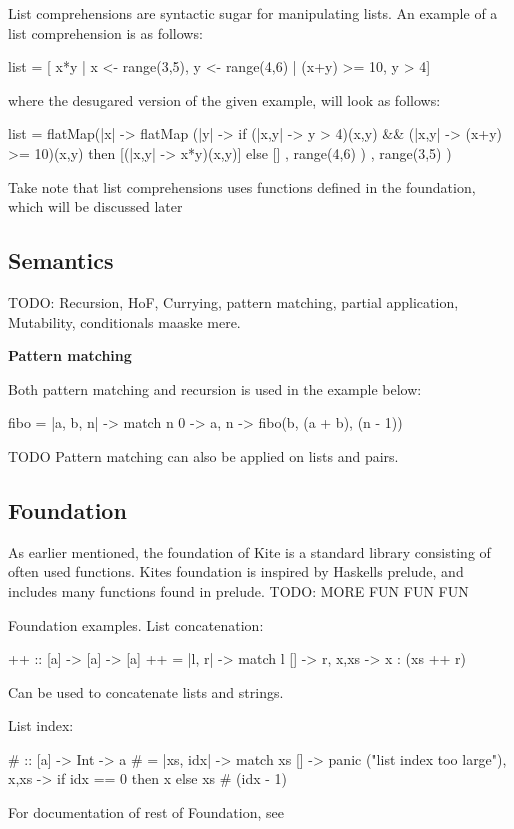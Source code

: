 \label{sec:ex-listcomp}
List comprehensions are syntactic sugar for manipulating
lists. An example of a list comprehension is as follows:
\begin{kite}
  
  list = [ x*y | x <- range(3,5), y <- range(4,6) | (x+y) >= 10, y > 4]
\end{kite}
where the desugared version of the given example, will look as follows:
\begin{kite}

  list =
  flatMap(|x| -> {
    flatMap (|y| -> {
      if (|x,y| -> {y > 4})(x,y) && (|x,y| -> {(x+y) >= 10})(x,y) 
         then [(|x,y| -> {x*y})(x,y)] 
         else []
    } , range(4,6) )
}, range(3,5) )
\end{kite}
Take note that list comprehensions uses functions defined in the
foundation, which will be discussed later
\subsection{Semantics}
\label{sec:currying}

TODO: Recursion, HoF, Currying, pattern matching,
partial application, Mutability, conditionals maaske mere.

\textbf{Pattern matching}


Both pattern matching and recursion is used in the example below:
\begin{kite}

fibo = |a, b, n| -> {
    match n {
    0 -> a,
    n -> fibo(b, (a + b), (n - 1))
    }
}
\end{kite}

TODO Pattern matching can also be applied on lists and pairs.

\subsection{Foundation}

As earlier mentioned, the foundation of Kite is a standard library
consisting of often used functions. Kites foundation is inspired by
Haskells prelude, and includes many functions found in
prelude. 
TODO: MORE FUN FUN FUN

Foundation examples.
List concatenation:
\begin{kite}

  {++} :: [a] -> [a] -> [a]
  {++} = |l, r| -> {
    match l {
      [] -> r,
      x,xs -> x : (xs ++ r)
    }
  }
\end{kite}
Can be used to concatenate lists and strings.

List index:
\begin{kite}

  {#} :: [a] -> Int -> a
  {#} = |xs, idx| -> {
    match xs {
      [] -> panic ("list index too large"),
      x,xs -> if idx == 0 then x else xs # (idx - 1)
    }
  }
\end{kite}

For documentation of rest of Foundation, see 
